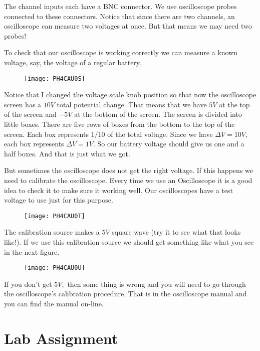 The channel inputs each have a BNC connector. We use oscilloscope probes
connected to these connectors. Notice that since there are two channels, an
oscilloscope can measure two voltages at once. But that means we may need
two probes!

To check that our oscilloscope is working correctly we can measure a known
voltage, say, the voltage of a regular battery.

\begin{figure}[h!]
\texttt{[image: PH4CAU0S]}
\end{figure}Notice that I changed the voltage
scale knob position so that now the oscilloscope screen has a $10\unit{V}$
total potential change. That means that we have $5\unit{V}$ at the top of
the screen and $-5\unit{V}$ at the bottom of the screen. The screen is
divided into little boxes. There are five rows of boxes from the bottom to
the top of the screen. Each box represents $1/10$ of the total voltage.
Since we have $\Delta V=10\unit{V},$ each box represents $\Delta V=1\unit{V}%
. $ So our battery voltage should give us one and a half boxes. And that is
just what we got.

But sometimes the oscilloscope does not get the right voltage. If this
happens we need to calibrate the oscilloscope. Every time we use an
Oscilloscope it is a good idea to check it to make sure it working well. Our
oscilloscopes have a test voltage to use just for this purpose.

\begin{figure}[h!]
\texttt{[image: PH4CAU0T]}
\end{figure}

The calibration source makes a $5\unit{V}$ square wave (try it to see what
that looks like!). If we use this calibration source we should get something
like what you see in the next figure. \begin{figure}[h!]
\texttt{[image: PH4CAU0U]}
\end{figure}If you don't get $5\unit{V},$
then some thing is wrong and you will need to go through the oscilloscope's
calibration procedure. That is in the oscilloscope manual and you can find
the manual on-line.








\section{Lab Assignment}


